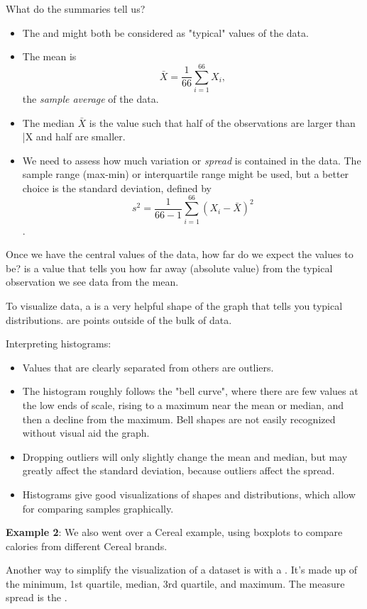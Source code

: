 What do the summaries tell us?
\begin{itemize}
    \item The  and  might both be considered as "typical" values of the data.
    \item The mean is \[\bar{X} = \frac{1}{66}\sum_{i=1}^{66}X_i,\] the \textit{sample average} of the data.
    \item The median $\bar{X}$ is the value such that half of the observations are larger than \bar{X} and half are smaller.
    \item We need to assess how much variation or \textit{spread} is contained in the data. The sample range (max-min) or interquartile range might be used, but a better choice is the standard deviation, defined by \[s^2 = \frac{1}{66-1}\sum_{i=1}^{66}(X_i-\bar{X})^2\].
\end{itemize}

Once we have the central values of the data, how far do we expect the values to be?  is a value that tells you how far away (absolute value) from the typical observation we see data from the mean.

To visualize data, a  is a very helpful shape of the graph that tells you typical distributions.  are points outside of the bulk of data.

Interpreting histograms:
\begin{itemize}
    \item Values that are clearly separated from others are outliers.
    \item The histogram roughly follows the "bell curve", where there are few values at the low ends of scale, rising to a maximum near the mean or median, and then a decline from the maximum. Bell shapes are not easily recognized without visual aid the graph.
    \item Dropping outliers will only slightly change the mean and median, but may greatly affect the standard deviation, because outliers affect the spread.
    \item Histograms give good visualizations of shapes and distributions, which allow for comparing samples graphically.
\end{itemize}

\textbf{Example 2}: We also went over a Cereal example, using boxplots to compare calories from different Cereal brands. 

Another way to simplify the visualization of a dataset is with a . It's made up of the minimum, 1st quartile, median, 3rd quartile, and maximum. The measure spread is the .

